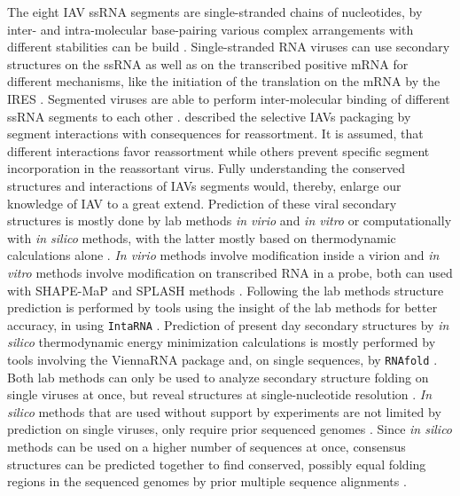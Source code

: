 The eight \gls{IAV} \gls{ssRNA} segments are single-stranded chains of nucleotides, by inter- and intra-molecular base-pairing various complex arrangements with different stabilities can be build \autocite{higgs_rna_2000, dadonaite_structure_2019}. Single-stranded RNA viruses can use secondary structures on the \gls{ssRNA} as well as on the transcribed positive \gls{mRNA} for different mechanisms, like the initiation of the translation on the \gls{mRNA} by the \gls{IRES} \autocite{kieft_viral_2008}. Segmented viruses are able to perform inter-molecular binding of different \gls{ssRNA} segments to each other \autocite{moss_identification_2011, dadonaite_structure_2019}. \textcite{gerber_selective_2014} described the selective \glspl{IAV} packaging by segment interactions with consequences for reassortment. It is assumed, that different interactions favor reassortment while others prevent specific segment incorporation in the reassortant virus. Fully understanding the conserved structures and interactions of \glspl{IAV} segments would, thereby, enlarge our knowledge of \gls{IAV} to a great extend. Prediction of these viral secondary structures is mostly done by lab methods \textit{in virio} and \textit{in vitro} or computationally with \textit{in silico} methods, with the latter mostly based on thermodynamic calculations alone \autocite{moss_identification_2011, dadonaite_structure_2019}. \textit{In virio} methods involve modification inside a virion and \textit{in vitro} methods involve modification on transcribed RNA in a probe, both can used with SHAPE-MaP and SPLASH methods \autocite{smola_selective_2015, dadonaite_structure_2019}. Following the lab methods structure prediction is performed by tools using the insight of the lab methods for better accuracy, in \textcite{dadonaite_structure_2019} using \texttt{IntaRNA} \autocite{mann_intarna_2017}. Prediction of present day secondary structures by \textit{in silico} thermodynamic energy minimization calculations is mostly performed by tools involving the ViennaRNA package and, on single sequences, by \texttt{RNAfold} \autocite{lorenz_viennarna_2011}. Both lab methods can only be used to analyze secondary structure folding on single viruses at once, but reveal structures at single-nucleotide resolution \autocite{dadonaite_structure_2019}. \textit{In silico} methods that are used without support by experiments are not limited by prediction on single viruses, only require prior sequenced genomes \autocite{moss_identification_2011, dadonaite_structure_2019}. Since \textit{in silico} methods can be used on a higher number of sequences at once, consensus structures can be predicted together to find conserved, possibly equal folding regions in the sequenced genomes by prior multiple sequence alignments \autocite{moss_identification_2011}. 

